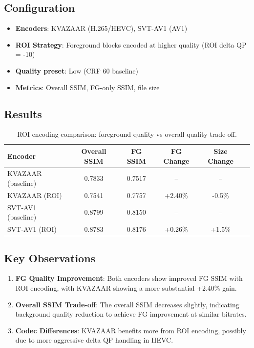 \documentclass[11pt,a4paper]{article}
\begin{document}
\subsection{Configuration}
\begin{itemize}
    \item \textbf{Encoders}: KVAZAAR (H.265/HEVC), SVT-AV1 (AV1)
    \item \textbf{ROI Strategy}: Foreground blocks encoded at higher quality (ROI delta QP = -10)
    \item \textbf{Quality preset}: Low (CRF 60 baseline)
    \item \textbf{Metrics}: Overall SSIM, FG-only SSIM, file size
\end{itemize}

\subsection{Results}

\begin{table}[h]
\centering
\begin{tabular}{lccccc}
\toprule
\textbf{Encoder} & \textbf{Overall SSIM} & \textbf{FG SSIM} & \textbf{FG Change} & \textbf{Size Change} \\
\midrule
KVAZAAR (baseline) & 0.7833 & 0.7517 & -- & -- \\
KVAZAAR (ROI) & 0.7541 & 0.7757 & +2.40\% & -0.5\% \\
\midrule
SVT-AV1 (baseline) & 0.8799 & 0.8150 & -- & -- \\
SVT-AV1 (ROI) & 0.8783 & 0.8176 & +0.26\% & +1.5\% \\
\bottomrule
\end{tabular}
\caption{ROI encoding comparison: foreground quality vs overall quality trade-off.}
\label{tab:roi}
\end{table}

\subsection{Key Observations}
\begin{enumerate}
    \item \textbf{FG Quality Improvement}: Both encoders show improved FG SSIM with ROI encoding, with KVAZAAR showing a more substantial +2.40\% gain.
    \item \textbf{Overall SSIM Trade-off}: The overall SSIM decreases slightly, indicating background quality reduction to achieve FG improvement at similar bitrates.
    \item \textbf{Codec Differences}: KVAZAAR benefits more from ROI encoding, possibly due to more aggressive delta QP handling in HEVC.
\end{enumerate}
\end{document}
